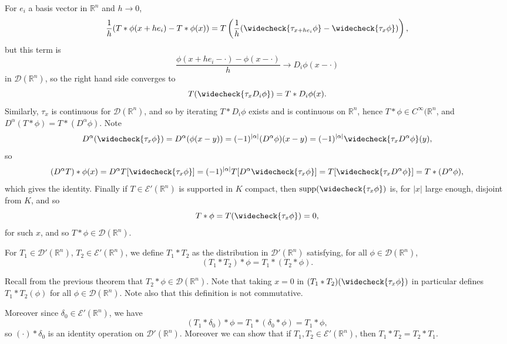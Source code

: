 \documentclass[12pt]{article}
\begin{document}
\begin{proofbox}
	For $e_i$ a basis vector in $\mathbb{R}^n$ and $h \to 0$,
	\[
		\frac{1}{h} (T \ast \phi(x + h e_i) - T \ast \phi(x)) = T \left( \frac{1}{h}(\widecheck{\tau_{x + he_i}\phi} - \widecheck{\tau_x \phi}) \right),
	\]
	but this term is
	\[
	\frac{\phi(x + he_i - \cdot) - \phi(x - \cdot)}{h} \to D_i\phi(x - \cdot)
	\]
	in $\mathcal{D}(\mathbb{R}^n)$, so the right hand side converges to
	\[
		T(\widecheck{\tau_x D_i \phi}) = T \ast D_i \phi(x).
	\]
	Similarly, $\tau_x$ is continuous for $\mathcal{D}(\mathbb{R}^n)$, and so by iterating $T \ast D_i \phi$ exists and is continuous on $\mathbb{R}^n$, hence $T \ast \phi \in C^\infty (\mathbb{R}^n$, and $D^\alpha(T \ast \phi) = T \ast (D^\alpha \phi)$. Note
	 \[
		 D^\alpha(\widecheck{\tau_x \phi}) = D^\alpha(\phi(x - y)) = (-1)^{|\alpha|} (D^\alpha \phi)(x - y) = (-1)^{|\alpha|} \widecheck{\tau_x D^\alpha \phi}(y),
	\]
	so
	\[
		(D^\alpha T) \ast \phi(x) = D^\alpha T[\widecheck{\tau_x \phi}] = (-1)^{|\alpha|} T[D^\alpha \widecheck{\tau_x \phi}] = T[\widecheck{\tau_x D^\alpha \phi}] = T \ast (D^\alpha \phi),
	\]
	which gives the identity. Finally if $T \in \mathcal{E}'(\mathbb{R}^n)$ is supported in $K$ compact, then $\mathrm{supp}(\widecheck{\tau_x \phi})$ is, for $|x|$ large enough, disjoint from $K$, and so
	\[
		T \ast \phi = T(\widecheck{\tau_x \phi}) = 0,
	\]
	for such $x$, and so $T \ast \phi \in \mathcal{D}(\mathbb{R}^n)$.
\end{proofbox}

\begin{definition}
	For $T_1 \in \mathcal{D}'(\mathbb{R}^n)$, $T_2 \in \mathcal{E}'(\mathbb{R}^n)$, we define $T_1 \ast T_2$ as the distribution in $\mathcal{D}'(\mathbb{R}^n)$ satisfying, for all $\phi \in \mathcal{D}(\mathbb{R}^n)$,
	\[
		(T_1 \ast T_2) \ast \phi = T_1 \ast (T_2 \ast \phi).
	\]
\end{definition}

Recall from the previous theorem that $T_2 \ast \phi \in \mathcal{D}(\mathbb{R}^n)$. Note that taking $x = 0$ in $(T_1 \ast T_2)(\widecheck{\tau_x \phi})$ in particular defines $T_1 \ast T_2(\phi)$ for all $\phi \in \mathcal{D}(\mathbb{R}^n)$. Note also that this definition is not commutative.

Moreover since $\delta_0 \in \mathcal{E}'(\mathbb{R}^n)$, we have
\[
	(T_1 \ast \delta_0) \ast \phi = T_1 \ast (\delta_0 \ast \phi) = T_1 \ast \phi,
\]
so $(\cdot) \ast \delta_0$ is an identity operation on $\mathcal{D}'(\mathbb{R}^n)$.
Moreover we can show that if $T_1, T_2 \in \mathcal{E}'(\mathbb{R}^n)$, then $T_1 \ast T_2 = T_2 \ast T_1$.
\end{document}
